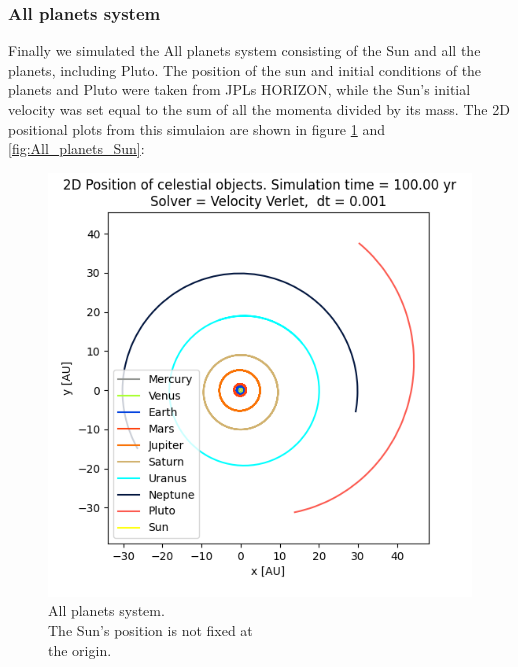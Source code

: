 \documentclass[american,a4paper,12pt]{article}
\begin{document}
\subsubsection{All planets system}
Finally we simulated the All planets system consisting of the Sun and all the planets, including Pluto. The position of the sun and initial conditions of the planets and Pluto were taken from JPLs HORIZON, while the Sun's initial velocity was set equal to the sum of all the momenta divided by its mass. The 2D positional plots from this simulaion are shown in figure \ref{fig:All_planets} and \ref{fig:All_planets_Sun}: 
\begin{figure}[H]
  \centering
  \begin{minipage}[b]{0.49\textwidth}
    \includegraphics[width=\textwidth]{figures/All_planets.png}
    \caption{All planets system.\\The Sun's position is not fixed at\\the origin.}
    \label{fig:All_planets}
  \end{minipage}
  \hfill
  \begin{minipage}[b]{0.49\textwidth}

\end{minipage}
\end{figure}
\end{document}
